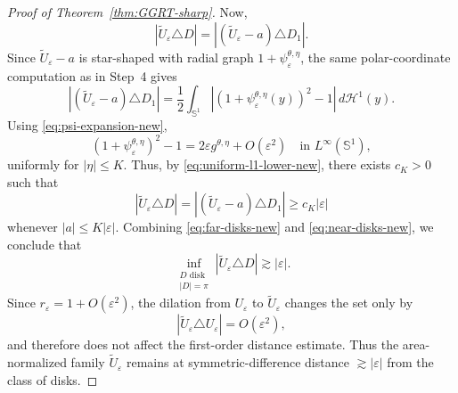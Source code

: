 \documentclass[a4paper,11pt,reqno]{amsart}
\numberwithin{equation}{section}
\theoremstyle{plain} %
\theoremstyle{definition} %
\theoremstyle{remark}
\begin{document}
\begin{proof}[Proof of Theorem~\ref{thm:GGRT-sharp}]
Now,
\[
|\widetilde U_\varepsilon \triangle D|
=
|(\widetilde U_\varepsilon-a)\triangle D_1|.
\]
Since $\widetilde U_\varepsilon-a$ is star-shaped with radial graph
$1+\psi_\varepsilon^{\theta,\eta}$, the same polar-coordinate computation as in
Step~4 gives
\[
|(\widetilde U_\varepsilon-a)\triangle D_1|
=
\frac12\int_{\mathbb S^1}
\left|(1+\psi_\varepsilon^{\theta,\eta}(y))^2-1\right|
\,d\mathcal H^1(y).
\]
Using \eqref{eq:psi-expansion-new},
\[
(1+\psi_\varepsilon^{\theta,\eta})^2-1
=
2\varepsilon g^{\theta,\eta}+O(\varepsilon^2)
\quad \text{in } L^\infty(\mathbb S^1),
\]
uniformly for $|\eta|\leq K$. Thus, by \eqref{eq:uniform-l1-lower-new},
there exists $c_K>0$ such that
\begin{equation}\label{eq:near-disks-new}
|\widetilde U_\varepsilon \triangle D|
=
|(\widetilde U_\varepsilon-a)\triangle D_1|
\geq
c_K |\varepsilon|
\end{equation}
whenever $|a|\leq K|\varepsilon|$. Combining \eqref{eq:far-disks-new} and \eqref{eq:near-disks-new}, we conclude
that
\[
\inf_{\substack{D \text{ disk}\\ |D|=\pi}}
|\widetilde U_\varepsilon \triangle D|
\gtrsim |\varepsilon|.
\]
Since \(r_\varepsilon=1+O(\varepsilon^2)\), the dilation from \(U_\varepsilon\)
to \(\widetilde U_\varepsilon\) changes the set only by
\[
|\widetilde U_\varepsilon\triangle U_\varepsilon|=O(\varepsilon^2),
\]
and therefore does not affect the first-order distance estimate. Thus the
area-normalized family \(\widetilde U_\varepsilon\) remains at
symmetric-difference distance \(\gtrsim |\varepsilon|\) from the class of
disks.


\end{proof}
\end{document}
